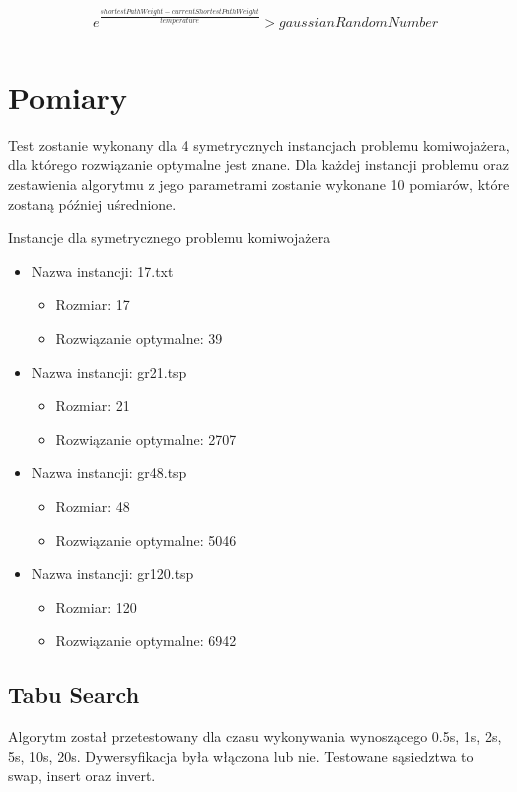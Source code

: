 \documentclass[12pt,a4paper,titlepage]{article}
\begin{document}
\begin{myequation}[H]
\label{eq:t}
\begin{equation}
    \begin{split}
    &e^\frac{shortestPathWeight - currentShortestPathWeight}{temperature} > gaussianRandomNumber \\
    \end{split}
\end{equation}
\end{myequation}

\section{Pomiary}
Test zostanie wykonany dla 4 symetrycznych instancjach problemu komiwojażera, dla którego rozwiązanie optymalne jest znane. Dla każdej instancji problemu oraz zestawienia algorytmu z jego parametrami zostanie wykonane 10 pomiarów, które zostaną później uśrednione.

Instancje dla symetrycznego problemu komiwojażera
\begin{itemize}
    \item Nazwa instancji: 17.txt
    \begin{itemize}
        \item Rozmiar: 17
        \item Rozwiązanie optymalne: 39
    \end{itemize}
    \item Nazwa instancji: gr21.tsp
    \begin{itemize}
        \item Rozmiar: 21
        \item Rozwiązanie optymalne: 2707
    \end{itemize}
    \item Nazwa instancji: gr48.tsp
    \begin{itemize}
        \item Rozmiar: 48
        \item Rozwiązanie optymalne: 5046
    \end{itemize}
    \item Nazwa instancji: gr120.tsp
    \begin{itemize}
        \item Rozmiar: 120
        \item Rozwiązanie optymalne: 6942
    \end{itemize}
\end{itemize}

\subsection{Tabu Search}
Algorytm został przetestowany dla czasu wykonywania wynoszącego 0.5s, 1s, 2s, 5s, 10s, 20s. Dywersyfikacja była włączona lub nie. Testowane sąsiedztwa to swap, insert oraz invert.
\end{document}
